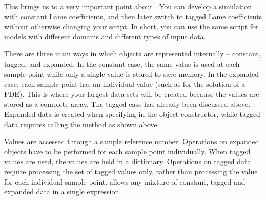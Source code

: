 This brings us to a very important point about \escript.
You can develop a simulation with constant Lame coefficients, and then later
switch to tagged Lame coefficients without otherwise changing your \PYTHON script.
In short, you can use the same script for models with different domains and
different types of input data.

There are three main ways in which \Data objects are represented internally --
constant, tagged, and expanded.
In the constant case, the same value is used at each sample point while only a
single value is stored to save memory.
In the expanded case, each sample point has an individual value (such as for the solution of a PDE).
This is where your largest data sets will be created because the values are
stored as a complete array.
The tagged case has already been discussed above.
Expanded data is created when specifying  in the \Data
object constructor, while tagged data requires calling the 
method as shown above.

Values are accessed through a sample reference number.
Operations on expanded \Data objects have to be performed for each sample
point individually.
When tagged values are used, the values are held in a dictionary.
Operations on tagged data require processing the set of tagged values only,
rather than processing the value for each individual sample point.
\escript allows any mixture of constant, tagged and expanded data in a single expression.

